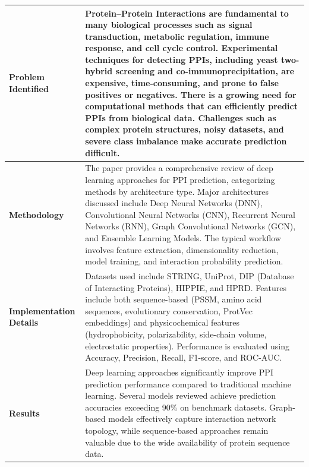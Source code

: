 \documentclass[12pt,a4paper]{report}
\begin{document}
\begin{table}[H]
\centering
\renewcommand{\arraystretch}{1.5}
\begin{tabular}{|p{}|p{}|}
\hline
\textbf{Problem Identified} & Protein–Protein Interactions are fundamental to many biological processes such as signal transduction, metabolic regulation, immune response, and cell cycle control. Experimental techniques for detecting PPIs, including yeast two-hybrid screening and co-immunoprecipitation, are expensive, time-consuming, and prone to false positives or negatives. There is a growing need for computational methods that can efficiently predict PPIs from biological data. Challenges such as complex protein structures, noisy datasets, and severe class imbalance make accurate prediction difficult. \\ \hline
\textbf{Methodology} & The paper provides a comprehensive review of deep learning approaches for PPI prediction, categorizing methods by architecture type. Major architectures discussed include Deep Neural Networks (DNN), Convolutional Neural Networks (CNN), Recurrent Neural Networks (RNN), Graph Convolutional Networks (GCN), and Ensemble Learning Models. The typical workflow involves feature extraction, dimensionality reduction, model training, and interaction probability prediction. \\ \hline
\textbf{Implementation Details} & Datasets used include STRING, UniProt, DIP (Database of Interacting Proteins), HIPPIE, and HPRD. Features include both sequence-based (PSSM, amino acid sequences, evolutionary conservation, ProtVec embeddings) and physicochemical features (hydrophobicity, polarizability, side-chain volume, electrostatic properties). Performance is evaluated using Accuracy, Precision, Recall, F1-score, and ROC-AUC. \\ \hline
\textbf{Results} & Deep learning approaches significantly improve PPI prediction performance compared to traditional machine learning. Several models reviewed achieve prediction accuracies exceeding 90\% on benchmark datasets. Graph-based models effectively capture interaction network topology, while sequence-based approaches remain valuable due to the wide availability of protein sequence data. \\ \hline
\end{tabular}
\end{table}

\newpage
\end{document}
